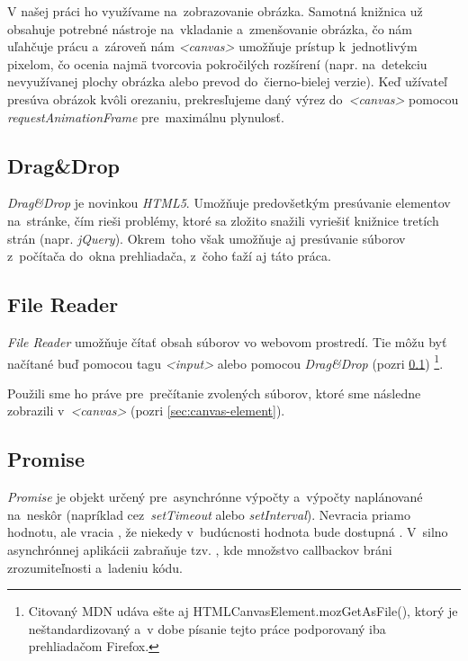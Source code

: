 V našej práci ho využívame na~zobrazovanie obrázka. Samotná knižnica už obsahuje potrebné nástroje na~vkladanie a~zmenšovanie obrázka, čo nám uľahčuje prácu a~zároveň nám \emph{<canvas>} umožňuje prístup k~jednotlivým pixelom, čo ocenia najmä tvorcovia pokročilých rozšírení (napr. na~detekciu nevyužívanej plochy obrázka alebo prevod do~čierno-bielej verzie). Keď užívateľ presúva obrázok kvôli orezaniu, prekresľujeme daný výrez do~\emph{<canvas>} pomocou \emph{requestAnimationFrame} \cite{MDN_RequestAnimationFrame} pre~maximálnu plynulosť.


\subsection{Drag\&Drop}
\label{sec:drag-n-drop}

\emph{Drag\&Drop} je novinkou \emph{HTML5}. Umožňuje predovšetkým presúvanie elementov na~stránke, čím rieši problémy, ktoré sa zložito snažili vyriešiť knižnice tretích strán (napr. \emph{jQuery}). Okrem~toho však umožňuje aj presúvanie súborov z~počítača do~okna prehliadača, z~čoho ťaží aj táto práca.


\subsection{File Reader}
\label{sec:file-reader}

\emph{File Reader} umožňuje čítať obsah súborov vo webovom prostredí. Tie môžu byť načítané buď pomocou tagu \emph{<input>} alebo pomocou \emph{Drag\&Drop} (pozri \ref{sec:drag-n-drop}) \cite{MDN_FileReader}\footnote{Citovaný MDN udáva ešte aj HTMLCanvasElement.mozGetAsFile(), ktorý je neštandardizovaný a~v dobe písanie tejto práce podporovaný iba prehliadačom Firefox.}.

Použili sme ho práve pre~prečítanie zvolených súborov, ktoré sme následne zobrazili v~\emph{<canvas>} (pozri \ref{sec:canvas-element}).


\subsection{Promise}

\emph{Promise} je objekt určený pre~asynchrónne výpočty a~výpočty naplánované na~neskôr (napríklad cez~\emph{setTimeout} alebo \emph{setInterval}). Nevracia priamo hodnotu, ale vracia , že niekedy v~budúcnosti hodnota bude dostupná \cite{MDN_Promise}. V~silno asynchrónnej aplikácii zabraňuje tzv. , kde množstvo callbackov bráni zrozumiteľnosti a~ladeniu kódu.

